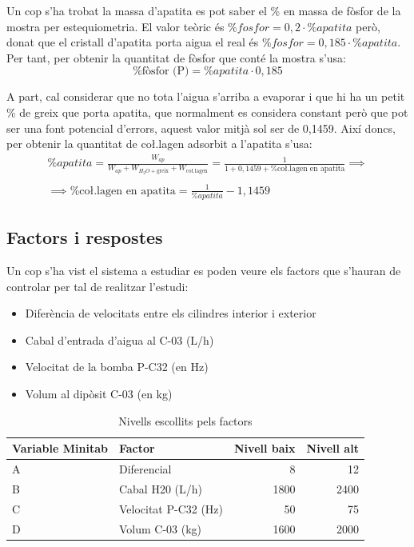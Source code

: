 \documentclass[a4paper]{article}
\begin{document}
Un cop s'ha trobat la massa d'apatita es pot saber el \% en massa de fòsfor de la mostra per estequiometria. El valor teòric és $\% fosfor = 0,2 \cdot \% apatita$ però, donat que el cristall d'apatita porta aigua el real és $\% fosfor = 0,185 \cdot \% apatita$. Per tant, per obtenir la quantitat de fòsfor que conté la mostra s'usa:
$$
\boxed{\% \text{fòsfor (P)} = \% apatita \cdot 0,185}
$$

A part, cal considerar que no tota l'aigua s'arriba a evaporar i que hi ha un petit \% de greix que porta apatita, que normalment es considera constant però que pot ser una font potencial d'errors, aquest valor mitjà sol ser de 0,1459. Així doncs, per obtenir la quantitat de co\l.lagen adsorbit a l'apatita s'usa:
\begin{gather*}
	\% apatita =
	\frac{W_{ap}}{W_{ap} + W_{H_2O + \text{greix}} + W_{\text{co\l.lagen}}} =
	\frac{1}{1 + 0,1459 + \% \text{co\l.lagen en apatita}} \implies \\ \\
	\implies 
	\boxed{\% \text{co\l.lagen en apatita} = \frac{1}{\% apatita} - 1,1459}
\end{gather*}

\newpage

\subsection{Factors i respostes}

Un cop s'ha vist el sistema a estudiar es poden veure els factors que s'hauran de controlar per tal de realitzar l'estudi:

\begin{itemize}
	\item Diferència de velocitats entre els cilindres interior i exterior
	\item Cabal d'entrada d'aigua al C-03 (L/h)
	\item Velocitat de la bomba P-C32 (en Hz)
	\item Volum al dipòsit C-03 (en kg)
\end{itemize}

\begin{table}[H]
	\centering
	\begin{tabular}{ l | l | r | r }
		\rowcolor{gray!60}
		Variable Minitab & Factor & Nivell baix & Nivell alt \\ \hline
		A & Diferencial & 8 & 12 \\
		B & Cabal H20 (L/h)& 1800 & 2400 \\
		C & Velocitat P-C32 (Hz) & 50 & 75 \\
		D & Volum C-03 (kg) & 1600 & 2000 \\
	\end{tabular}
	\caption{Nivells escollits pels factors}
\end{table}
\end{document}
